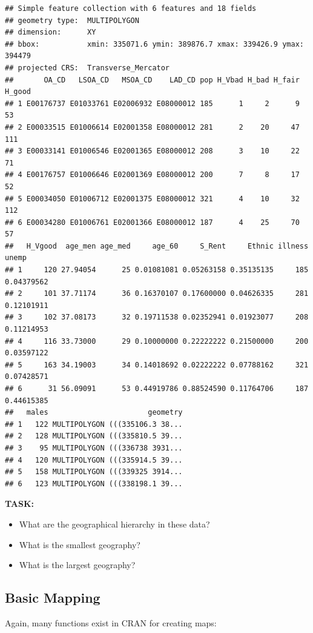 \documentclass[
]{book}
\providecommand{\tightlist}{%
  \setlength{\itemsep}{0pt}\setlength{\parskip}{0pt}}
\begin{document}
\begin{verbatim}
## Simple feature collection with 6 features and 18 fields
## geometry type:  MULTIPOLYGON
## dimension:      XY
## bbox:           xmin: 335071.6 ymin: 389876.7 xmax: 339426.9 ymax: 394479
## projected CRS:  Transverse_Mercator
##       OA_CD   LSOA_CD   MSOA_CD    LAD_CD pop H_Vbad H_bad H_fair H_good
## 1 E00176737 E01033761 E02006932 E08000012 185      1     2      9     53
## 2 E00033515 E01006614 E02001358 E08000012 281      2    20     47    111
## 3 E00033141 E01006546 E02001365 E08000012 208      3    10     22     71
## 4 E00176757 E01006646 E02001369 E08000012 200      7     8     17     52
## 5 E00034050 E01006712 E02001375 E08000012 321      4    10     32    112
## 6 E00034280 E01006761 E02001366 E08000012 187      4    25     70     57
##   H_Vgood  age_men age_med     age_60     S_Rent     Ethnic illness      unemp
## 1     120 27.94054      25 0.01081081 0.05263158 0.35135135     185 0.04379562
## 2     101 37.71174      36 0.16370107 0.17600000 0.04626335     281 0.12101911
## 3     102 37.08173      32 0.19711538 0.02352941 0.01923077     208 0.11214953
## 4     116 33.73000      29 0.10000000 0.22222222 0.21500000     200 0.03597122
## 5     163 34.19003      34 0.14018692 0.02222222 0.07788162     321 0.07428571
## 6      31 56.09091      53 0.44919786 0.88524590 0.11764706     187 0.44615385
##   males                       geometry
## 1   122 MULTIPOLYGON (((335106.3 38...
## 2   128 MULTIPOLYGON (((335810.5 39...
## 3    95 MULTIPOLYGON (((336738 3931...
## 4   120 MULTIPOLYGON (((335914.5 39...
## 5   158 MULTIPOLYGON (((339325 3914...
## 6   123 MULTIPOLYGON (((338198.1 39...
\end{verbatim}

\textbf{TASK:}

\begin{itemize}
\tightlist
\item
  What are the geographical hierarchy in these data?
\item
  What is the smallest geography?
\item
  What is the largest geography?
\end{itemize}

\hypertarget{basic-mapping}{%
\subsection{Basic Mapping}\label{basic-mapping}}

Again, many functions exist in CRAN for creating maps:
\end{document}
